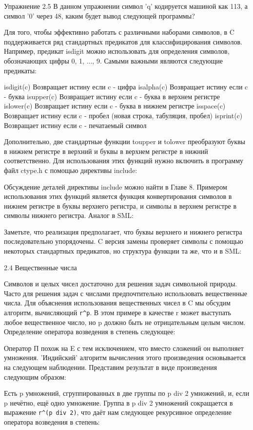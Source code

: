 Упражнение 2.5 В данном упражнении символ 'q' кодируется машиной как 113, а символ '0' через 48, каким будет вывод следующей программы?

Для того, чтобы эффективно работать с различными наборами символов, в C поддерживается ряд стандартных предикатов для классифицирования символов. Например, предикат isdigit можно использовать для определения символов, обозначающих цифры 0, 1, ..., 9. Самыми важными являются следующие предикаты:

isdigit(c) Возвращает истину если c - цифра
isalpha(c) Возвращает истину если c - буква
isupper(c) Возвращает истину если c - буква в верхнем регистре
islower(c) Возвращает истину если c - буква в нижнем регистре
isspace(c) Возвращает истину если c - пробел (новая строка, табуляция, пробел)
isprint(c) Возвращает истину если c - печатаемый символ

Дополнительно, две стандартные функции toupper и tolower преобразуют буквы в нижнем регистре в верхний и буквы в верхнем регистре в нижний соответственно. Для использования этих функций нужно включить в программу файл ctype.h с помощью директивы include:

Обсуждение деталей директивы include можно найти в Главе 8. Примером использования этих функций является функция конвертирования символов в нижнем регистре в буквы верхнего регистра, и символы в верхнем регистре в символы нижнего регистра. Аналог в SML:

Заметьте, что реализация предполагает, что буквы верхнего и нижнего регистра последовательно упорядочены. C версия замены проверяет символы с помощью некоторых стандартных предикатов, но структура функции та же, что и в SML:

2.4 Вещественные числа

Символов и целых чисел достаточно для решения задач символьной природы. Часто для решения задач с числами предпочтительно использовать вещественные числа. Для объяснения использования вещественных чисел в C мы обсудим алгоритм, вычисляющий \lstinline|r^p|. В этом примере в качестве r может выступать любое вещественное число, но p должно быть не отрицательным целым числом. Определение оператора возведения в степень следующее:

Оператор П похож на E с тем исключением, что вместо сложений он выполняет умножения. 'Индийский' алгоритм вычисления этого произведения основывается на следующем наблюдении. Представим результат в виде произведения следующим образом:

Есть p умножений, сгруппированных в две группы по p div 2 умножений, и, если p нечётно, ещё одно умножение. Группа в p div 2 умножений сокращается в выражение \lstinline|r^(p div 2)|, что даёт нам следующее рекурсивное определение оператора возведения в степень:

